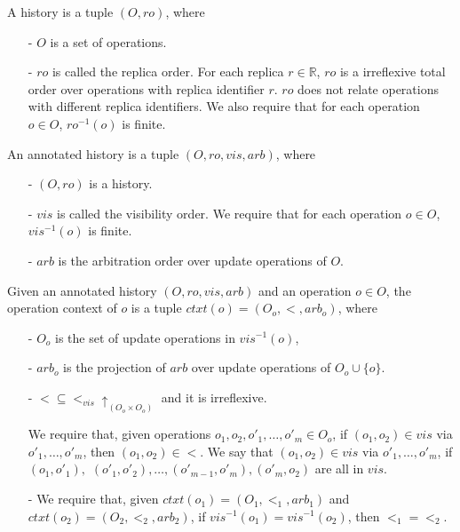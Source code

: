 A history is a tuple $(O,\mathit{ro})$, where

\begin{itemize}
\setlength{\itemsep}{0.5pt}
\item[-] $O$ is a set of operations.

\item[-] $\mathit{ro}$ is called the replica order. For each replica $r \in \mathbb{R}$, $\mathit{ro}$ is a irreflexive total order over operations with replica identifier $r$. $\mathit{ro}$ does not relate operations with different replica identifiers. We also require that for each operation $o \in O$, $\mathit{ro}^{-1}(o)$ is finite.
\end{itemize}

An annotated history is a tuple $(O,\mathit{ro},\mathit{vis},\mathit{arb})$, where

\begin{itemize}
\setlength{\itemsep}{0.5pt}
\item[-] $(O,\mathit{ro})$ is a history.

\item[-] $\mathit{vis}$ is called the visibility order. We require that for each operation $o \in O$, $\mathit{vis}^{-1}(o)$ is finite.

\item[-] $\mathit{arb}$ is the arbitration order over update operations of $O$.
\end{itemize}


Given an annotated history $(O,\mathit{ro},\mathit{vis},\mathit{arb})$ and an operation $o \in O$, the operation context of $o$ is a tuple $ctxt(o)=(O_o,<,arb_o)$, where

\begin{itemize}
\setlength{\itemsep}{0.5pt}
\item[-] $O_o$ is the set of update operations in $\mathit{vis}^{-1}(o)$,

\item[-] $arb_o$ is the projection of $arb$ over update operations of $O_o \cup \{ o \}$. 

\item[-] $< \subseteq <_{\mathit{vis}} \uparrow_{(O_o \times O_o)}$ and it is irreflexive.

We require that, given operations $o_1,o_2,o'_1,\ldots,o'_m \in O_o$, if $(o_1,o_2) \in \mathit{vis}$ via $o'_1,\ldots,o'_m$, then $(o_1,o_2) \in <$. We say that $(o_1,o_2) \in \mathit{vis}$ via $o'_1,\ldots,o'_m$, if $(o_1,o'_1),$ $(o'_1,o'_2), \ldots, (o'_{\mathit{m-1}},o'_m),(o'_m,o_2)$ are all in $\mathit{vis}$.

\item[-] {\color {red}We require that, given $ctxt(o_1)=(O_1,<_1,arb_1)$ and $ctxt(o_2)=(O_2,<_2,arb_2)$, if $\mathit{vis}^{-1}(o_1) = \mathit{vis}^{-1}(o_2)$, then $<_1 = <_2$.} 
\end{itemize}

